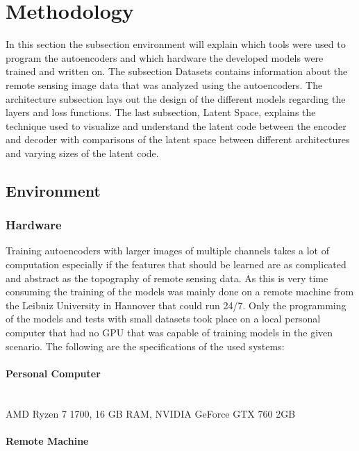 \section{Methodology}

In this section the subsection environment will explain which tools were used to program the autoencoders
and which hardware the developed models were trained and written on. The subsection Datasets 
contains information about the remote sensing image data that was analyzed using the autoencoders. 
The architecture subsection lays out 
the design of the different models regarding the layers and loss functions. The last subsection, 
Latent Space, explains the technique used to visualize and understand the latent code between the 
encoder and decoder with comparisons of the latent space between different architectures and varying
sizes of the latent code.

\subsection{Environment}

\subsubsection{Hardware}

Training autoencoders with larger images of multiple channels takes a lot of computation especially if the 
features that should be learned are as complicated and abstract as the topography of remote sensing data.
As this is very time consuming the training of the models was mainly done on a remote machine from the
Leibniz University in Hannover that could run 24/7. Only the
programming of the models and tests with small datasets took place on a local personal computer that had no
GPU that was capable of training models in the given scenario. The following
are the specifications of the used systems:\\

\paragraph{Personal Computer} \mbox{} \smallskip \\

AMD Ryzen 7 1700, 16 GB RAM, NVIDIA GeForce GTX 760 2GB

\paragraph{Remote Machine} \mbox{} \smallskip \\

